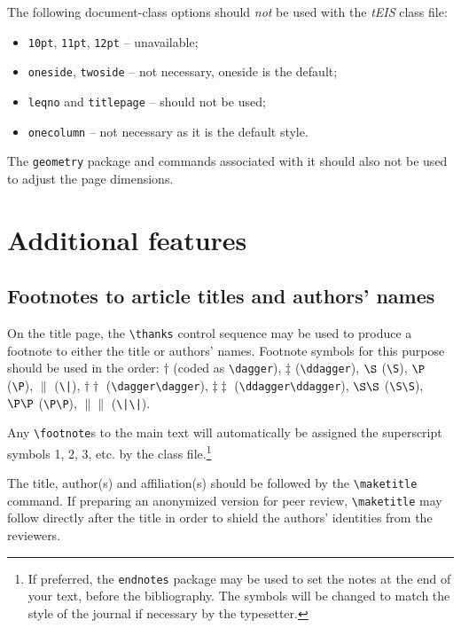 \documentclass[]{tEIS2e}
\theoremstyle{plain}
\theoremstyle{remark}
\begin{document}
The following document-class options should \emph{not} be used with the {\it tEIS} class file:
%
\begin{itemize}
   \item {\tt 10pt}, {\tt 11pt}, {\tt 12pt} -- unavailable;
   \item {\tt oneside}, {\tt twoside} -- not necessary, oneside is the default;
   \item {\tt leqno} and {\tt titlepage} -- should not be used;
   \item {\tt onecolumn} -- not necessary as it is the default style.
\end{itemize}
%
The {\tt geometry} package and commands associated with it should also not be used to adjust the page dimensions.


\section{Additional features}

\subsection{Footnotes to article titles and authors' names}

On the title page, the \verb"\thanks" control sequence may be used to produce a footnote to either the title or authors' names.
Footnote symbols for this purpose should be used in the order: $\dagger$ (coded as \verb"\dagger"), $\ddagger$ (\verb"\ddagger"), $\S$ (\verb"\S"), $\P$ (\verb"\P"), $\|$ (\verb"\|"),
$\dagger\dagger$ (\verb"\dagger\dagger"), $\ddagger\ddagger$ (\verb"\ddagger\ddagger"), $\S\S$ (\verb"\S\S"), $\P\P$ (\verb"\P\P"), $\|\|$ (\verb"\|\|").

Any \verb"\footnote"s to the main text will automatically be assigned the superscript
 symbols 1, 2, 3, etc. by the class file.\footnote{If preferred, the \texttt{endnotes} package
 may be used to set the notes at the end of your text, before the bibliography. The symbols will be changed to match the style of the journal if necessary by the typesetter.}

The title, author(s) and affiliation(s) should be followed by the {\verb"\maketitle"} command. If preparing an anonymized version for peer review, {\verb"\maketitle"} may follow directly after the title in order to shield the authors' identities from the reviewers.
\end{document}
